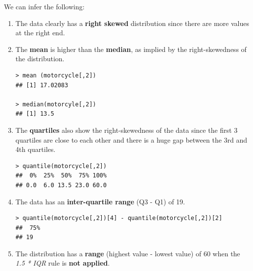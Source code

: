 \documentclass[12pt,letterpaper,titlepage,en-US]{article}
\begin{document}
We can infer the following:
\begin{enumerate}
\item The data  clearly has a \textbf{right skewed} distribution since there are more values at the right end.


\item The \textbf{mean} is higher than the \textbf{median}, as implied by the right-skewedness of the distribution.
\begin{knitrout}
\color{fgcolor}
\begin{kframe}

\begin{verbatim}
> mean (motorcycle[,2])
## [1] 17.02083

> median(motorcyle[,2])
## [1] 13.5
\end{verbatim}
\end{kframe}
\end{knitrout}


\item The \textbf{quartiles} also show the right-skewedness of the data since the first 3 quartiles are close to each other and there is a huge gap between the 3rd and 4th quartiles.

\begin{knitrout}
\color{fgcolor}
\begin{kframe}

\begin{verbatim}
> quantile(motorcycle[,2])
##  0%  25%  50%  75% 100% 
## 0.0  6.0 13.5 23.0 60.0 
\end{verbatim}
\end{kframe}
\end{knitrout}

\item The data has an \textbf{inter-quartile range} (Q3 - Q1) of 19.

\begin{knitrout}
\color{fgcolor}
\begin{kframe}

\begin{verbatim}
> quantile(motorcycle[,2])[4] - quantile(motorcycle[,2])[2]
##  75%
## 19
\end{verbatim}
\end{kframe}
\end{knitrout}


 \item The distribution has a \textbf{range} (highest value - lowest value) of 60 when the \emph{1.5 * IQR} rule is \textbf{not applied}.
\begin{knitrout}
\color{fgcolor}
\begin{kframe}


\end{kframe}
\end{knitrout}
\end{enumerate}
\end{document}
